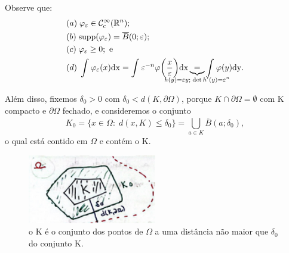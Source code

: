 \documentclass[../distribution_theory_notes.tex]{subfiles}
\begin{document}
\begin{proof*}
	Observe que:
	\begin{align*}
		 & (a)\; \varphi_{\varepsilon }\in \mathcal{C}_{c}^{\infty}(\mathbb{R}^{n});                                                                                                                                                                               \\
		 & (b)\; \mathrm{supp}(\varphi_{\varepsilon })=\overline{B}(0; \varepsilon );                                                                                                                                                                              \\
		 & (c)\; \varphi_{\varepsilon }\geq 0; \text{ e}                                                                                                                                                                                                           \\
		 & (d)\; \int_{}^{}\varphi_\varepsilon(x) \mathrm{dx}=\int_{}^{}\varepsilon^{-n}\varphi \biggl(\frac{x}{ \varepsilon }\biggr) \mathrm{dx} \underbrace{=}_{\mathclap{h(y)=\varepsilon y;\; \det{h'(y)}=\varepsilon^{n}}} \int_{}^{}\varphi (y) \mathrm{dy}.
	\end{align*}

	Além disso, fixemos \(\delta_{0}>0\) com \(\delta_{0}< d(K, \partial \Omega )\), porque \(K\cap \partial \Omega =\emptyset \) com K compacto e \(\partial \Omega \) fechado, e consideremos o conjunto
	\[
		K_{0}=\{x\in \Omega :\; d(x, K)\leq \delta_{0}\} = \bigcup_{a\in K}^{}\overline{B}(a; \delta_{0}),
	\]
	o qual está contido em \(\Omega \) e contém o K.
	\begin{figure}[H]
		\begin{center}
			\includegraphics[height=0.5\textheight, width=0.5\textwidth, keepaspectratio]{./Images/delta_from_k_09.png}
		\end{center}
		\caption{o K é o conjunto dos pontos de \(\Omega \) a uma distância não maior que \(\delta_{0}\) do conjunto K.}
	\end{figure}


\end{proof*}
\end{document}

